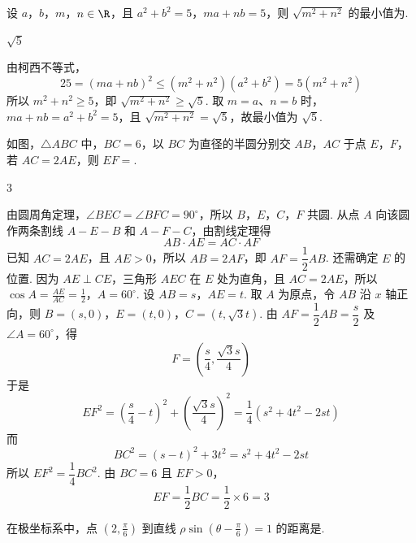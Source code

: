 \begin{problem}[A]
设 \(a\)，\(b\)，\(m\)，\(n \in \R\)，且 \(a^2 + b^2 = 5\)，\(ma + nb = 5\)，则 \(\sqrt{m^{2} + n^{2}}\) 的最小值为\fillinblank{}.
\end{problem}

\begin{answer}
\(\sqrt{5}\)
\end{answer}

\begin{solution}
由柯西不等式，
\[
25=(ma+nb)^2\leqslant (m^2+n^2)(a^2+b^2)=5(m^2+n^2)
\]
所以 \(m^2+n^2\geqslant5\)，即 \(\sqrt{m^2+n^2}\geqslant\sqrt5\). 取 \(m=a\)、\(n=b\) 时，\(ma+nb=a^2+b^2=5\)，且 \(\sqrt{m^2+n^2}=\sqrt5\)，故最小值为 \(\sqrt5\).
\end{solution}

\reuseproblemnumber
\begin{problem}[B]
如图，\(\triangle ABC\) 中，\(BC = 6\)，以 \(BC\) 为直径的半圆分别交 \(AB\)，\(AC\) 于点 \(E\)，\(F\)，若 \(AC = 2AE\)，则 \(EF =\)\fillinblank{}.

\end{problem}

\begin{answer}
3
\end{answer}

\begin{solution}
由圆周角定理，\(\angle BEC=\angle BFC=90^\circ\)，所以 \(B\)，\(E\)，\(C\)，\(F\) 共圆. 从点 \(A\) 向该圆作两条割线 \(A-E-B\) 和 \(A-F-C\)，由割线定理得
\[
AB\cdot AE=AC\cdot AF
\]
已知 \(AC=2AE\)，且 \(AE>0\)，所以 \(AB=2AF\)，即 \(AF=\dfrac12AB\). 还需确定 \(E\) 的位置. 因为 \(AE\perp CE\)，三角形 \(AEC\) 在 \(E\) 处为直角，且 \(AC=2AE\)，所以
\(\cos A=\frac{AE}{AC}=\frac12\)，\(A=60^\circ\).
设 \(AB=s\)，\(AE=t\). 取 \(A\) 为原点，令 \(AB\) 沿 \(x\) 轴正向，则
\(B=(s,0)\)，\(E=(t,0)\)，\(C=(t,\sqrt3t)\).
由 \(AF=\dfrac12AB=\dfrac{s}{2}\) 及 \(\angle A=60^\circ\)，得
\[
F=\left(\frac{s}{4},\frac{\sqrt3s}{4}\right)
\]
于是
\[
EF^2=\left(\frac{s}{4}-t\right)^2+\left(\frac{\sqrt3s}{4}\right)^2
=\frac14\left(s^2+4t^2-2st\right)
\]
而
\[
BC^2=(s-t)^2+3t^2=s^2+4t^2-2st
\]
所以 \(EF^2=\dfrac14BC^2\). 由 \(BC=6\) 且 \(EF>0\)，
\[
EF=\frac12BC=\frac12\times6=3
\]
\end{solution}

\reuseproblemnumber
\begin{problem}[C]
在极坐标系中，点 \(\left(2, \frac{\pi}{6}\right)\) 到直线 \(\rho \sin \left(\theta - \frac{\pi}{6}\right) = 1\) 的距离是\fillinblank{}.
\end{problem}

